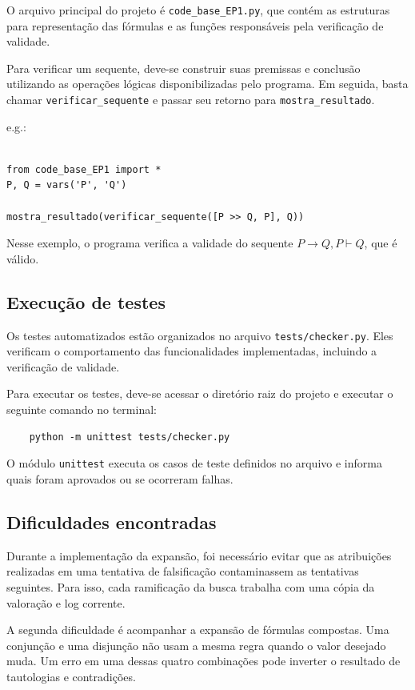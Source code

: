 \documentclass[a4paper]{article}
\begin{document}
O arquivo principal do projeto é \texttt{code\_base\_EP1.py}, que contém as estruturas para representação das fórmulas e as funções responsáveis pela verificação de validade.

Para verificar um sequente, deve-se construir suas premissas e conclusão utilizando as operações lógicas disponibilizadas pelo programa. Em seguida, basta chamar \texttt{verificar\_sequente} e passar seu retorno para \texttt{mostra\_resultado}.

e.g.:
\begin{verbatim}

from code_base_EP1 import *
P, Q = vars('P', 'Q')

mostra_resultado(verificar_sequente([P >> Q, P], Q))

\end{verbatim}

Nesse exemplo, o programa verifica a validade do sequente
$P \to Q, P \vdash Q$, que é válido.


\subsection{Execução de testes}

Os testes automatizados estão organizados no arquivo \texttt{tests/checker.py}. Eles verificam o comportamento das funcionalidades implementadas, incluindo a verificação de validade.

Para executar os testes, deve-se acessar o diretório raiz do projeto e executar o seguinte comando no terminal:

\begin{verbatim}
    python -m unittest tests/checker.py
\end{verbatim}

O módulo \texttt{unittest} executa os casos de teste definidos no arquivo e informa quais foram aprovados ou se ocorreram falhas.

\subsection{Dificuldades encontradas}

Durante a implementação da expansão, foi necessário evitar que as atribuições realizadas em uma tentativa de falsificação contaminassem as tentativas seguintes. Para isso, cada ramificação da busca trabalha com uma cópia da valoração e log corrente.

A segunda dificuldade é acompanhar a expansão de fórmulas compostas. Uma conjunção e uma disjunção não usam a mesma regra quando o valor desejado muda. Um erro em uma dessas quatro combinações pode inverter o resultado de tautologias e contradições. 
\end{document}
